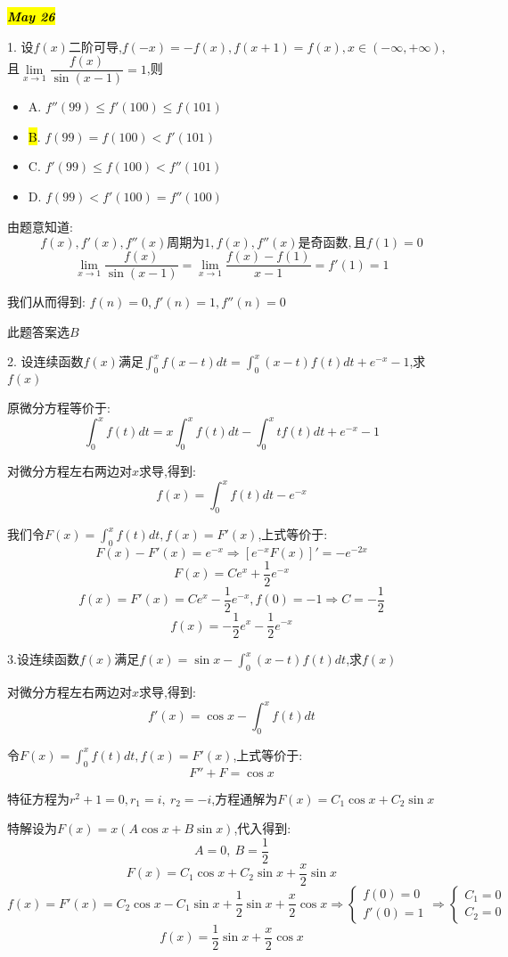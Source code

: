 
\hl{\textbf{\textit{May 26}}}

1. 设$f(x)$二阶可导,$f(-x)=-f(x),f(x+1)=f(x),x\in(-\infty,+\infty)$,且$\lim\limits_{x\rightarrow 1}\dfrac{f(x)}{\sin(x-1)}=1$,则
\begin{itemize}
	\item A. $f''(99)\leq f'(100)\leq f(101)$ 
	\item \hl{B}. $f(99)=f(100)<f'(101)$ 
	\item C. $f'(99)\leq f(100)<f''(101)$ 
	\item D. $f(99)< f'(100)=f''(100)$ 
\end{itemize}
\begin{solution}
	
	由题意知道: $$f(x),f'(x),f''(x)\text{周期为}1,f(x),f''(x)\text{是奇函数},\text{且}f(1)=0$$
	$$\lim\limits_{x\rightarrow 1}\frac{f(x)}{\sin(x-1)}=\lim\limits_{x\rightarrow 1}\frac{f(x)-f(1)}{x-1}=f'(1)=1$$
	
	我们从而得到: $f(n)=0,f'(n)=1,f''(n)=0$
	
	此题答案选$B$
\end{solution}


2. 设连续函数$f(x)$满足$\int_{0}^{x}f(x-t)dt=\int_{0}^{x}(x-t)f(t)dt+e^{-x}-1$,求$f(x)$
\begin{solution}
	
	原微分方程等价于: 
	$$\int_{0}^{x}f(t)dt=x\int_{0}^{x}f(t)dt-\int_{0}^{x}tf(t)dt+e^{-x}-1$$
	
	对微分方程左右两边对$x$求导,得到: 
	$$f(x)=\int_{0}^{x}f(t)dt-e^{-x}$$
	
	我们令$F(x)=\int_{0}^{x}f(t)dt,f(x)=F'(x)$,上式等价于: 
	$$F(x)-F'(x)=e^{-x}\Rightarrow [e^{-x}F(x)]'=-e^{-2x}$$
	$$F(x)=Ce^{x}+\frac{1}{2}e^{-x}$$
	$$f(x)=F'(x)=Ce^{x}-\frac{1}{2}e^{-x},f(0)=-1\Rightarrow C=-\frac{1}{2}$$
	$$f(x)=-\frac{1}{2}e^{x}-\frac{1}{2}e^{-x}$$
\end{solution}
3.设连续函数$f(x)$满足$f(x)=\sin x-\int_{0}^{x}(x-t)f(t)dt$,求$f(x)$
\begin{solution}
	
	对微分方程左右两边对$x$求导,得到: 
	$$f'(x)=\cos x-\int_{0}^{x}f(t)dt$$
	
	令$F(x)=\int_{0}^{x}f(t)dt,f(x)=F'(x)$,上式等价于: 
	$$F''+F=\cos x$$
	
	特征方程为$r^2+1=0,r_{1}=i,\ r_{2}=-i$,方程通解为$F(x)=C_{1}\cos x+C_{2}\sin x$
	
	特解设为$F(x)=x(A\cos x+B\sin x)$,代入得到: 
	$$A=0,\ B=\frac{1}{2}$$
	$$F(x)=C_{1}\cos x+C_{2}\sin x+\frac{x}{2}\sin x$$
	$$f(x)=F'(x)=C_{2}\cos x-C_{1}\sin x+\frac{1}{2}\sin x+\frac{x}{2}\cos x\Rightarrow \left\lbrace 
	\begin{array}{l}
		f(0)=0\\
		f'(0)=1
	\end{array}
	\right. \Rightarrow \left\lbrace 
	\begin{array}{l}
		C_{1}=0\\
		C_{2}=0
	\end{array}
	\right. $$
	$$f(x)=\frac{1}{2}\sin x+\frac{x}{2}\cos x$$
\end{solution}


